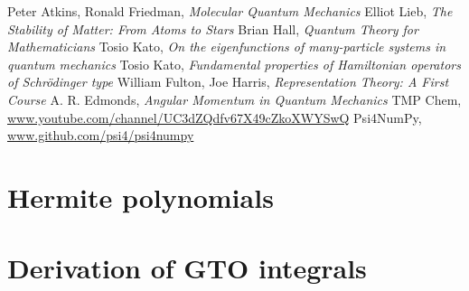 \documentclass{article}
\begin{document}
\begin{thebibliography}{9}
	Peter Atkins, Ronald Friedman,
	\textit{Molecular Quantum Mechanics}
	Elliot Lieb,
	\textit{The Stability of Matter: From Atoms to Stars}
	Brian Hall,
	\textit{Quantum Theory for Mathematicians}
	Tosio Kato,
	\textit{On the eigenfunctions of many-particle systems in quantum mechanics}
	Tosio Kato,
	\textit{Fundamental properties of Hamiltonian operators of Schrödinger type}
	William Fulton, Joe Harris,
	\textit{Representation Theory: A First Course}
	A. R. Edmonds,
	\textit{Angular Momentum in Quantum Mechanics}
	TMP Chem,
	\url{www.youtube.com/channel/UC3dZQdfv67X49cZkoXWYSwQ}
	Psi4NumPy,
	\url{www.github.com/psi4/psi4numpy}
\end{thebibliography}

\begin{appendices}
\section{Hermite polynomials} \label{apx:hermite}
\section{Derivation of GTO integrals} \label{apx:integrals}
\end{appendices}
\end{document}
